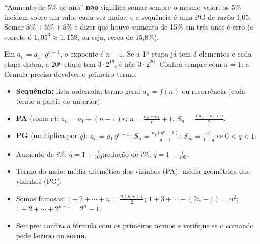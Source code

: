 \begin{atencao}
“Aumento de 5\% ao ano” \textbf{não} significa somar sempre o mesmo valor: os
5\% incidem sobre um valor cada vez maior, e a sequência é uma PG de razão
1,05. Somar $5\% + 5\% + 5\%$ e dizer que houve aumento de 15\% em três anos é
erro (o correto é $1{,}05^3 \approx 1{,}158$, ou seja, cerca de 15,8\%).
\end{atencao}

\begin{atencao}[Expoente da PG]
Em $a_n = a_1 \cdot q^{n-1}$, o expoente é $n - 1$. Se a 1ª etapa já tem 3
elementos e cada etapa dobra, a 20ª etapa tem $3 \cdot 2^{19}$, e não
$3 \cdot 2^{20}$. Confira sempre com $n = 1$: a fórmula precisa devolver o
primeiro termo.
\end{atencao}

\begin{resumo}
\begin{itemize}[leftmargin=1.2em,itemsep=2pt]
  \item \textbf{Sequência:} lista ordenada; termo geral $a_n = f(n)$ ou
        recorrência (cada termo a partir do anterior).
  \item \textbf{PA} (soma $r$): $a_n = a_1 + (n-1)r$;\quad
        $n = \frac{a_n - a_1}{r} + 1$;\quad
        $S_n = \frac{(a_1 + a_n)\,n}{2}$.
  \item \textbf{PG} (multiplica por $q$): $a_n = a_1\, q^{n-1}$;\quad
        $S_n = \frac{a_1 (q^n - 1)}{q - 1}$;\quad
        $S_\infty = \frac{a_1}{1-q}$ se $0 < q < 1$.
  \item Aumento de $i\%$: $q = 1 + \frac{i}{100}$;\quad redução de $i\%$:
        $q = 1 - \frac{i}{100}$.
  \item Termo do meio: média aritmética dos vizinhos (PA); média geométrica
        dos vizinhos (PG).
  \item Somas famosas: $1 + 2 + \cdots + n = \frac{n(n+1)}{2}$;\quad
        $1 + 3 + \cdots + (2n-1) = n^2$;\quad $1 + 2 + \cdots + 2^{n-1} = 2^n - 1$.
  \item Sempre: confira a fórmula com os primeiros termos e verifique se o
        comando pede \textbf{termo} ou \textbf{soma}.
\end{itemize}
\end{resumo}

\secaoenem

